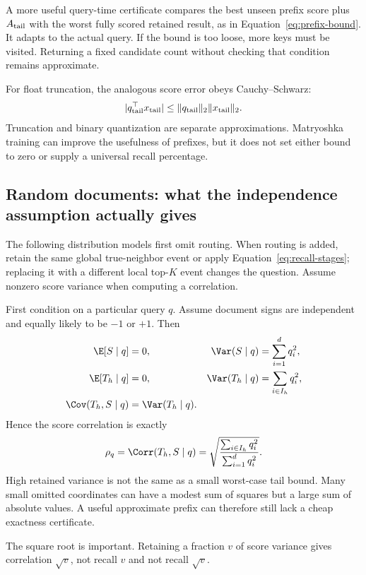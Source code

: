 A more useful query-time certificate compares the best unseen prefix score plus
$A_{\rm tail}$ with the worst fully scored retained result, as in Equation~\eqref{eq:prefix-bound}.
It adapts to the actual query. If the bound is too loose, more keys must be visited. Returning
a fixed candidate count without checking that condition remains approximate.

For float truncation, the analogous score error obeys Cauchy--Schwarz:
\[
|q_{\rm tail}^{\top}x_{\rm tail}|
\leq \|q_{\rm tail}\|_2\|x_{\rm tail}\|_2.
\]
Truncation and binary quantization are separate approximations. Matryoshka training can improve
the usefulness of prefixes, but it does not set either bound to zero or supply a universal
recall percentage.

\subsection{Random documents: what the independence assumption actually gives}
The following distribution models first omit routing. When routing is added, retain the same global true-neighbor event or apply Equation~\eqref{eq:recall-stages}; replacing it with a different local top-$K$ event changes the question. Assume nonzero score variance when computing a correlation.

First condition on a particular query $q$. Assume document signs are independent and equally
likely to be $-1$ or $+1$. Then
\begin{align}
\E[S\mid q]&=0,&\Var(S\mid q)&=\sum_{i=1}^{d}q_i^2,\\
\E[T_h\mid q]&=0,&\Var(T_h\mid q)&=\sum_{i\in I_h}q_i^2,\\
\Cov(T_h,S\mid q)&=\Var(T_h\mid q).&&
\end{align}
Hence the score correlation is exactly
\begin{equation}
\rho_q=\Corr(T_h,S\mid q)=
\sqrt{\frac{\sum_{i\in I_h}q_i^2}{\sum_{i=1}^{d}q_i^2}}.
\label{eq:rho-independent}
\end{equation}
High retained variance is not the same as a small worst-case tail bound. Many small omitted coordinates can have a modest sum of squares but a large sum of absolute values. A useful approximate prefix can therefore still lack a cheap exactness certificate.

The square root is important. Retaining a fraction $v$ of score variance gives correlation
$\sqrt v$, not recall $v$ and not recall $\sqrt v$.

